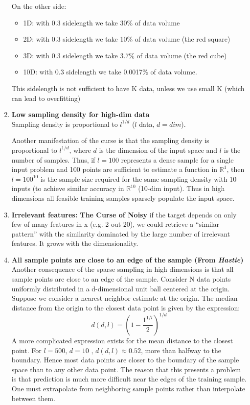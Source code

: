 \documentclass[../main.tex]{subfiles}
\begin{document}
\begin{enumerate}
    On the other side:
    \begin{itemize}
        \item 1D: with 0.3 sidelength we take 30\% of data volume
        \item 2D: with 0.3 sidelength we take 10\% of data volume (the red square)
        \item 3D: with 0.3 sidelength we take 3.7\% of data volume (the red cube)
        \item 10D: with 0.3 sidelength we take 0.0017\% of data volume.
    \end{itemize}
    This sidelength is not sufficient to have K data, unless we use small K (which can lead to overfitting)
    
    \item \textbf{Low sampling density for high-dim data}\\
    Sampling density is proportional to $l^{1/d}$ ($l$ data, $d=dim$).
    
    Another manifestation of the curse is that the sampling density is proportional to  $l^{1/d}$, where $d$ is the dimension of the input space and $l$ is the number of samples. Thus, if $l = 100$ represents a dense sample for a single input problem and 100 points are sufficient to estimate a function in $\mathbb{R}^1$, then $l = 100^{10}$ is the sample size required for the same sampling density with 10 inputs (to achieve similar accuracy in $\mathbb{R}^{10}$ (10-dim input). Thus in high dimensions all feasible training samples sparsely populate the input space.
    
    \item \textbf{Irrelevant features: The Curse of Noisy}
    if the target depends on only few of many features in x (e.g. 2 out 20), we could retrieve a “similar pattern” with the similarity dominated by the large number of irrelevant features. It grows with the dimensionality.
    
    
\item \textbf{All sample points are close to an edge of the sample (From \textit{Hastie})}
    Another consequence of the sparse sampling in high dimensions is that all sample points are close to an edge of the sample. Consider N data points uniformly distributed in a d-dimensional unit ball centered at the origin. Suppose we consider a nearest-neighbor estimate at the origin. The median distance from the origin to the closest data point is given by the expression:
    $$ d(d,l) = \left(1 - \frac{1^{1/l}}{2}\right)^{1/d}$$
    A more complicated expression exists for the mean distance to the closest point. For $l = 500$, $d = 10$ , $d(d,l) \approx	0.52$, more than halfway to the boundary. Hence most data points are closer to the boundary of the sample space than to any other data point. The reason that this presents a problem is that prediction is much more difficult near the edges of the training sample. One must extrapolate from neighboring sample points rather than interpolate between them.
\end{enumerate}
\end{document}
